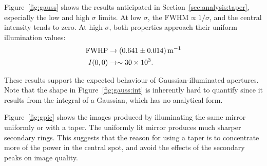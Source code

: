 \documentclass{article}
\newcommand{\R}[1]{\mathrm{#1}}
\begin{document}
Figure~\ref{fig:gauss} shows the results anticipated in Section~\ref{sec:analysis:taper}, especially the low and high $\sigma$ limits. At low $\sigma$, the $\R{FWHM} \propto 1/\sigma$, and the central intensity tends to zero. At high $\sigma$, both properties approach their uniform illumination values:
\begin{align*}
    \R{FWHP} &\rightarrow \SI{0.641 \pm 0.014}{\per\metre} \\
    I(0, 0) &\rightarrow \sim \num{30e3}.
\end{align*}

These results support the expected behaviour of Gaussian-illuminated apertures. Note that the shape in Figure~\ref{fig:gauss:int} is inherently hard to quantify since it results from the integral of a Gaussian, which has no analytical form.

Figure~\ref{fig:gpic} shows the images produced by illuminating the same mirror uniformly or with a taper. The uniformly lit mirror produces much sharper secondary rings. This suggests that the reason for using a taper is to concentrate more of the power in the central spot, and avoid the effects of the secondary peaks on image quality.
\end{document}
